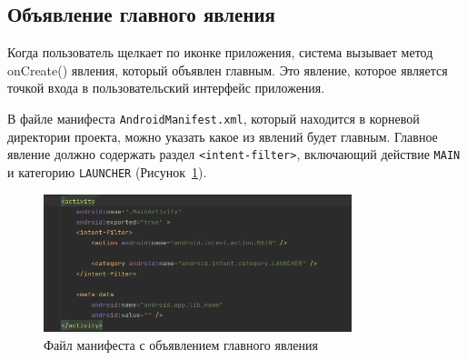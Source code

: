 \subsection{Объявление главного явления}
Когда пользователь щелкает по иконке приложения, система
вызывает метод onCreate() явления, который объявлен главным. Это
явление, которое является точкой входа в пользовательский интерфейс
приложения.\par
В файле манифеста \texttt{AndroidManifest.xml}, который находится в корневой
директории проекта, можно указать какое из явлений будет главным.
Главное явление должно содержать раздел \texttt{<intent-filter>},
включающий действие \texttt{MAIN} и категорию \texttt{LAUNCHER}
(Рисунок~\ref{fig:manifest:MAIN}).
\begin{figure}[h!tp]
	\centering
	\includegraphics[width=0.8\textwidth]{Screenshot from 2023-02-21 11-20-40.png}
	\caption{Файл манифеста с объявлением главного явления}
	\label{fig:manifest:MAIN}
\end{figure}

